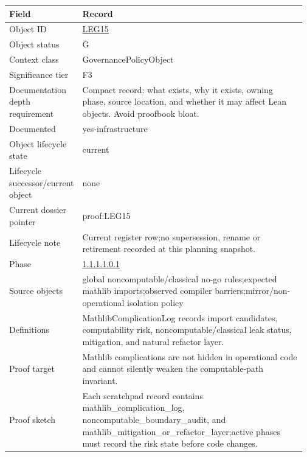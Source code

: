 \begin{longtable}{L{0.16\linewidth} L{0.81\linewidth}}
\hline
\textbf{Field} & \textbf{Record}\\
\hline
Object ID & \hyperlink{object-row-LEG15}{LEG15}\\
\hline\addlinespace[0.20em]
Object status & G\\
\hline\addlinespace[0.20em]
Context class & GovernancePolicyObject\\
\hline\addlinespace[0.20em]
Significance tier & F3\\
\hline\addlinespace[0.20em]
Documentation depth requirement & Compact record: what exists, why it exists, owning phase, source location, and whether it may affect Lean objects. Avoid proofbook bloat.\\
\hline\addlinespace[0.20em]
Documented & yes-infrastructure\\
\hline\addlinespace[0.20em]
Object lifecycle state & current\\
\hline\addlinespace[0.20em]
Lifecycle successor/\allowbreak{}current object & none\\
\hline\addlinespace[0.20em]
Current dossier pointer & proof:LEG15\\
\hline\addlinespace[0.20em]
Lifecycle note & Current register row;\newline no supersession, rename or retirement recorded at this planning snapshot.\\
\hline\addlinespace[0.20em]
Phase & \hyperlink{phase-row-1-1-1-1-0-1}{1.1.1.1.0.1}\\
\hline\addlinespace[0.20em]
Source objects & global noncomputable/\allowbreak{}classical no-go rules;\newline expected mathlib imports;\newline observed compiler barriers;\newline mirror/\allowbreak{}non-operational isolation policy\\
\hline\addlinespace[0.20em]
Definitions & MathlibComplicationLog records import candidates, computability risk, noncomputable/\allowbreak{}classical leak status, mitigation, and natural refactor layer.\\
\hline\addlinespace[0.20em]
Proof target & Mathlib complications are not hidden in operational code and cannot silently weaken the computable-path invariant.\\
\hline\addlinespace[0.20em]
Proof sketch & Each scratchpad record contains mathlib\_complication\_log, noncomputable\_boundary\_audit, and mathlib\_mitigation\_or\_refactor\_layer;\newline active phases must record the risk state before code changes.\\

\end{longtable}
